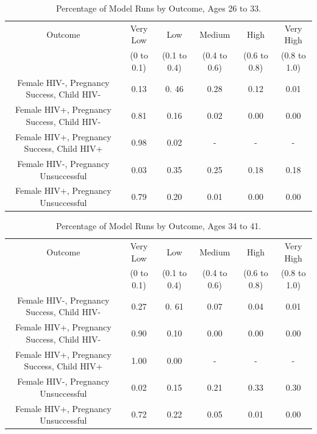\documentclass[11pt]{nih_mod}
\begin{document}
\begin{table}	
\begin{center}
\begin{tabular}{|c|c|c|c|c|c|}
\hline
Outcome & Very Low& Low & Medium& High& Very High\\
 & (0 to 0.1) & (0.1 to 0.4) & (0.4 to 0.6) & (0.6 to 0.8) & (0.8 to 1.0)\\
\hline
\hline
Female HIV-, Pregnancy Success, Child HIV- & 0.13 & 0. 46 & 0.28 & 0.12 & 0.01\\
Female HIV+, Pregnancy Success, Child HIV- & 0.81 & 0.16 & 0.02 & 0.00 & 0.00\\
Female HIV+, Pregnancy Success, Child HIV+ & 0.98 & 0.02 & - & - &- \\
Female HIV-, Pregnancy Unsuccessful & 0.03 & 0.35 & 0.25 & 0.18 & 0.18 \\
Female HIV+, Pregnancy Unsuccessful & 0.79 & 0.20 & 0.01 & 0.00 & 0.00\\
\hline
\end{tabular}
	\caption{Percentage of Model Runs by Outcome, Ages 26 to 33. \label{tab:outcomefreqs26}}
\end{center}
\end{table}

\begin{table}	
\begin{center}
\begin{tabular}{|c|c|c|c|c|c|}
\hline
Outcome & Very Low& Low & Medium& High& Very High\\
 & (0 to 0.1) & (0.1 to 0.4) & (0.4 to 0.6) & (0.6 to 0.8) & (0.8 to 1.0)\\
\hline
\hline
Female HIV-, Pregnancy Success, Child HIV- & 0.27 & 0. 61 & 0.07 & 0.04 & 0.01\\
Female HIV+, Pregnancy Success, Child HIV- & 0.90 & 0.10 & 0.00 & 0.00 & 0.00\\
Female HIV+, Pregnancy Success, Child HIV+ & 1.00 & 0.00 & - & - &- \\
Female HIV-, Pregnancy Unsuccessful & 0.02 & 0.15 & 0.21 & 0.33 & 0.30 \\
Female HIV+, Pregnancy Unsuccessful & 0.72 & 0.22 & 0.05 & 0.01 & 0.00\\
\hline
\end{tabular}
	\caption{Percentage of Model Runs by Outcome, Ages 34 to 41. \label{tab:outcomefreqs34}}
\end{center}
\end{table}
\end{document}
